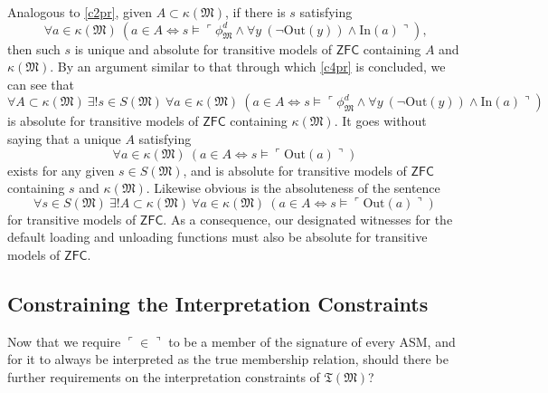 \documentclass[12pt, twoside]{memoir}
\numberwithin{equation}{section}
\theoremstyle{definition}
\theoremstyle{remark}
\theoremstyle{definition}
\theoremstyle{definition}
\theoremstyle{definition}
\theoremstyle{remark}
\begin{document}
Analogous to \ref{c2pr}, given $A \subset \kappa(\mathfrak{M})$, if there is $s$ satisfying
\begin{equation*}
    \forall a \in \kappa(\mathfrak{M}) \ (a \in A \iff s \models \ulcorner \phi^d_{\mathfrak{M}} \wedge \forall y \ (\neg \mathrm{Out}(y)) \wedge \mathrm{In}(a) \urcorner) \text{,}
\end{equation*}
then such $s$ is unique and absolute for transitive models of $\mathsf{ZFC}$ containing $A$ and $\kappa(\mathfrak{M})$. By an argument similar to that through which \ref{c4pr} is concluded, we can see that 
\begin{equation*}
    \forall A \subset \kappa(\mathfrak{M}) \ \exists ! s \in S(\mathfrak{M}) \ \forall a \in \kappa(\mathfrak{M}) \ (a \in A \iff s \models \ulcorner \phi^d_{\mathfrak{M}} \wedge \forall y \ (\neg \mathrm{Out}(y)) \wedge \mathrm{In}(a) \urcorner)
\end{equation*}
is absolute for transitive models of $\mathsf{ZFC}$ containing $\kappa(\mathfrak{M})$. It goes without saying that a unique $A$ satisfying
\begin{equation*}
    \forall a \in \kappa(\mathfrak{M}) \ (a \in A \iff s \models \ulcorner \mathrm{Out}(a) \urcorner)
\end{equation*}
exists for any given $s \in S(\mathfrak{M})$, and is absolute for transitive models of $\mathsf{ZFC}$ containing $s$ and $\kappa(\mathfrak{M})$. Likewise obvious is the absoluteness of the sentence
\begin{equation*}
    \forall s \in S(\mathfrak{M}) \ \exists ! A \subset \kappa(\mathfrak{M}) \ \forall a \in \kappa(\mathfrak{M}) \ (a \in A \iff s \models \ulcorner \mathrm{Out}(a) \urcorner)
\end{equation*}
for transitive models of $\mathsf{ZFC}$. As a consequence, our designated witnesses for the default loading and unloading functions must also be absolute for transitive models of $\mathsf{ZFC}$.

\subsection{Constraining the Interpretation Constraints} 

Now that we require $\ulcorner \in \urcorner$ to be a member of the signature of every ASM, and for it to always be interpreted as the true membership relation, should there be further requirements on the interpretation constraints of $\mathfrak{T}(\mathfrak{M})$?
\end{document}
